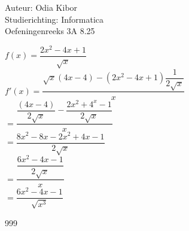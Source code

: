 \documentclass[a4paper]{article}
\begin{document}
  
\noindent \large Auteur: Odia Kibor \\
\noindent \large Studierichting: Informatica\\
\noindent \large Oefeningenreeks 3A 8.25 \\

\medskip

\normalsize

$f(x) = \dfrac{2x^{2}-4x+1}{\sqrt{x}}$ \\[10pt]

$f'(x) = \dfrac{\sqrt{x}\left(4x-4\right)-\left(2x^{2}-4x+1\right)\dfrac{1}{2\sqrt{x}}}{x}$ \\[10pt]

$= \dfrac{\dfrac{\left(4x-4\right)}{2\sqrt{x}}-\dfrac{2x^{2}+4^{x}-1}{2\sqrt{x}}}{x}$ \\[10pt]

$= \dfrac{8x^{2}-8x-2x^{2}+4x-1}{2\sqrt{x}}$ \\[10pt]

$= \dfrac{\dfrac{6x^{2}-4x-1}{2\sqrt{x}}}{x}$ \\[10pt]

$= \dfrac{6x^{2}-4x-1}{\sqrt{x^{3}}}$ \\

\begin{thebibliography}{999}
\end{thebibliography}
\end{document}
